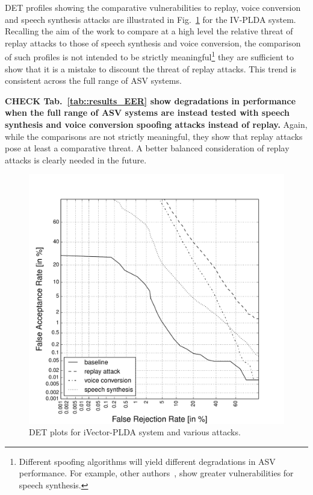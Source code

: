 DET profiles showing the comparative vulnerabilities to replay, voice conversion and speech synthesis attacks are illustrated in Fig.~\ref{fig::DETs_4attacks} for the IV-PLDA system.  Recalling the aim of the work to compare at a high level the relative threat of replay attacks to those of speech synthesis and voice conversion, the comparison of such profiles is not intended to be strictly meaningful\footnote{Different spoofing algorithms will yield different degradations in ASV performance.  For example, other authors~\cite{DeLeon2012,Ergunay2015,Wu2015}, show greater vulnerabilities for speech synthesis.} they are sufficient to show that it is a mistake to discount the threat of replay attacks.  This trend is consistent across the full range of ASV systems.  

{\bfseries CHECK Tab.~\ref{tab::results_EER} show degradations in performance when the full range of ASV systems are instead tested with speech synthesis and voice conversion spoofing attacks instead of replay.}  Again, while the comparisons are not strictly meaningful, they show that replay attacks pose at least a comparative threat.  A better balanced consideration of replay attacks is clearly needed in the future.

\begin{figure}[!t]
	\centering
	\includegraphics[width=1\linewidth]{Figs/DETs_IV_ss_vc_rp.pdf}
	\caption{DET plots for iVector-PLDA system and various attacks.}
	\label{fig::DETs_4attacks}
\end{figure}




